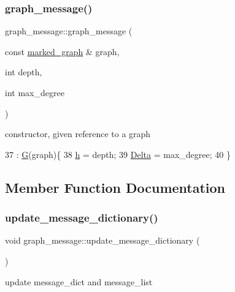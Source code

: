 \subsubsection{\texorpdfstring{graph\+\_\+message()}{graph\_message()}}
{\footnotesize\ttfamily graph\+\_\+message\+::graph\+\_\+message (\begin{DoxyParamCaption}\item[{const \hyperlink{classmarked__graph}{marked\+\_\+graph} \&}]{graph,  }\item[{int}]{depth,  }\item[{int}]{max\+\_\+degree }\end{DoxyParamCaption})\hspace{0.3cm}{\ttfamily [inline]}}



constructor, given reference to a graph 


\begin{DoxyCode}
37                                                                      : \hyperlink{classgraph__message_abffce6d6a7868da0e747425569759f0f}{G}(graph)\{
38     \hyperlink{classgraph__message_a934d63ed7275c211e13c6fb68824ed46}{h} = depth;
39     \hyperlink{classgraph__message_a45dfd061b7bc73572e5132fbf66efd55}{Delta} = max\_degree;
40   \}
\end{DoxyCode}


\subsection{Member Function Documentation}
\mbox{\label{classgraph__message_aede1ecdcf72bac693d357241eddb20b0}} 
\subsubsection{\texorpdfstring{update\+\_\+message\+\_\+dictionary()}{update\_message\_dictionary()}}
{\footnotesize\ttfamily void graph\+\_\+message\+::update\+\_\+message\+\_\+dictionary (\begin{DoxyParamCaption}{ }\end{DoxyParamCaption})}



update message\+\_\+dict and message\+\_\+list 

